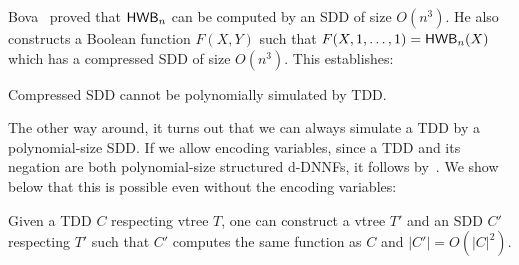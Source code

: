\documentclass[a4paper,UKenglish,cleveref, autoref, thm-restate]{lipics-v2021}
\begin{document}
Bova~\cite{Bova16} proved that $\mathsf{HWB}_n$ can be computed by an SDD of size $O(n^3)$. He also constructs a Boolean function $F(X,Y)$ such that $F(X,1,\dots,1) = \mathsf{HWB}_n(X)$ which has a compressed SDD of size $O(n^3)$. This establishes:

\begin{theorem}
Compressed SDD cannot be polynomially simulated by TDD.
\end{theorem}

The other way around, it turns out that we can always simulate a TDD by a polynomial-size SDD. If we allow encoding variables, since a TDD and its negation are both polynomial-size structured d-DNNFs, it follows by~\cite[Theorem 1]{BolligF21}. We show below that this is possible even without the encoding variables: 

\begin{theorem}[$\star$]
  \label{thm:tdd<sdd}
  Given a TDD $C$ respecting vtree $T$, one can construct a vtree $T'$ and an SDD $C'$ respecting $T'$ such that $C'$ computes the same function as $C$ and $|C'| = O(|C|^2)$. 
\end{theorem}
\end{document}
